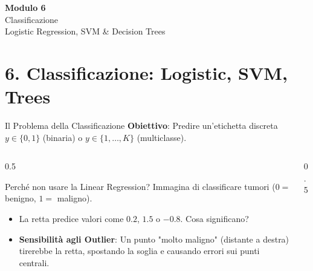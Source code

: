 \documentclass[aspectratio=169, 10pt]{beamer}
\begin{document}
\begin{frame}[plain]
    \centering
    \vspace{2cm}
    {\Huge \textbf{Modulo 6}}\\[0.5cm]
    {\Huge \textcolor{Accent}{Classificazione}}\\[1cm]
    {\large Logistic Regression, SVM \& Decision Trees}
\end{frame}

\section{6. Classificazione: Logistic, SVM, Trees}

\begin{frame}{Il Problema della Classificazione}
    \textbf{Obiettivo}: Predire un'etichetta discreta $y \in \{0, 1\}$ (binaria) o $y \in \{1, \dots, K\}$ (multiclasse).
    
    \begin{columns}[T]
        \begin{column}{0.5\textwidth}
            \begin{alertblock}{Perché non usare la Linear Regression?}
                Immagina di classificare tumori ($0=$ benigno, $1=$ maligno).
                \begin{itemize}
                    \item La retta predice valori come $0.2$, $1.5$ o $-0.8$. Cosa significano?
                    \item \textbf{Sensibilità agli Outlier}: Un punto "molto maligno" (distante a destra) tirerebbe la retta, spostando la soglia e causando errori sui punti centrali.
                \end{itemize}
            \end{alertblock}
        \end{column}
        \begin{column}{0.5\textwidth}
            \centering
\end{column}
\end{columns}
\end{frame}
\end{document}
